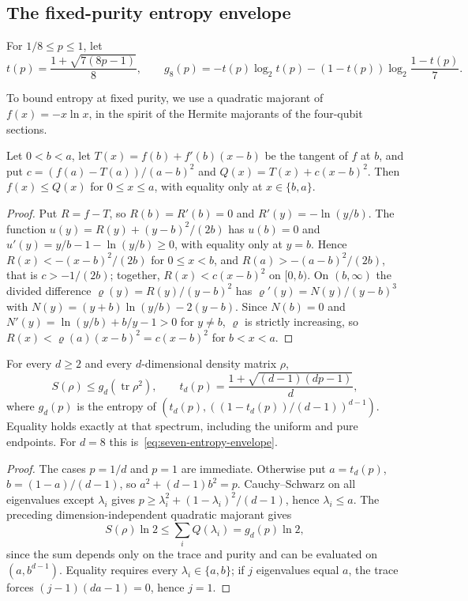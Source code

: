 \subsection{The fixed-purity entropy envelope}
\label{sec:seven-entropy-envelope}

For \(1/8\le p\le1\), let
\begin{equation}\label{eq:seven-entropy-envelope}
 t(p)=\frac{1+\sqrt{7(8p-1)}}8,\qquad
 g_8(p)=-t(p)\log_2t(p)
 -(1-t(p))\log_2\frac{1-t(p)}7.
\end{equation}

To bound entropy at fixed purity, we use a quadratic majorant of \(f(x)=-x\ln x\), in the spirit of the
Hermite majorants of the four-qubit sections.

\begin{lemma}
\label{lem:seven-entropy-quadratic-majorant}
Let \(0<b<a\), let \(T(x)=f(b)+f'(b)(x-b)\) be the tangent of \(f\) at \(b\), and put
\(c=(f(a)-T(a))/(a-b)^2\) and \(Q(x)=T(x)+c(x-b)^2\). Then \(f(x)\le Q(x)\) for
\(0\le x\le a\), with equality only at \(x\in\{b,a\}\).
\end{lemma}
\begin{proof}
Put \(R=f-T\), so \(R(b)=R'(b)=0\) and \(R'(y)=-\ln(y/b)\).
The function \(u(y)=R(y)+(y-b)^2/(2b)\) has \(u(b)=0\) and
\(u'(y)=y/b-1-\ln(y/b)\ge0\), with equality only at \(y=b\). Hence
\(R(x)<-(x-b)^2/(2b)\) for \(0\le x<b\), and \(R(a)>-(a-b)^2/(2b)\), that is
\(c>-1/(2b)\); together, \(R(x)<c(x-b)^2\) on \([0,b)\). On \((b,\infty)\) the
divided difference \(\varrho(y)=R(y)/(y-b)^2\) has
\(\varrho'(y)=N(y)/(y-b)^3\) with \(N(y)=(y+b)\ln(y/b)-2(y-b)\). Since \(N(b)=0\)
and \(N'(y)=\ln(y/b)+b/y-1>0\) for \(y\ne b\), \(\varrho\) is strictly increasing, so
\(R(x)<\varrho(a)(x-b)^2=c(x-b)^2\) for \(b<x<a\).
\end{proof}

\begin{lemma}
\label{lem:seven-fixed-purity-envelope}
For every $d\ge2$ and every $d$-dimensional density matrix $\rho$,
\[
 S(\rho)\le g_d(\operatorname{tr}\rho^2),\qquad
 t_d(p)=\frac{1+\sqrt{(d-1)(dp-1)}}d,
\]
where $g_d(p)$ is the entropy of
$(t_d(p),((1-t_d(p))/(d-1))^{d-1})$.
Equality holds exactly at that spectrum, including the uniform
and pure endpoints. For $d=8$ this is~\eqref{eq:seven-entropy-envelope}.
\end{lemma}
\begin{proof}
The cases $p=1/d$ and $p=1$ are immediate. Otherwise put
$a=t_d(p)$, $b=(1-a)/(d-1)$, so $a^2+(d-1)b^2=p$.
Cauchy--Schwarz on all eigenvalues except $\lambda_i$ gives
$p\ge\lambda_i^2+(1-\lambda_i)^2/(d-1)$, hence $\lambda_i\le a$.
The preceding dimension-independent quadratic majorant gives
\[
 S(\rho)\ln2\le\sum_iQ(\lambda_i)=g_d(p)\ln2,
\]
since the sum depends only on the trace and purity and can
be evaluated on $(a,b^{d-1})$. Equality requires every
$\lambda_i\in\{a,b\}$; if $j$ eigenvalues equal $a$, the trace
forces $(j-1)(da-1)=0$, hence $j=1$.
\end{proof}
